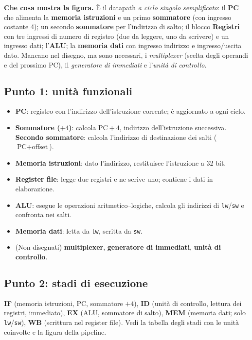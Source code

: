 \textbf{Che cosa mostra la figura.} È il datapath \emph{a ciclo singolo semplificato}: il \textbf{PC} che alimenta la \textbf{memoria istruzioni} e un primo \textbf{sommatore} (con ingresso costante 4); un secondo \textbf{sommatore} per l'indirizzo di salto; il blocco \textbf{Registri} con tre ingressi di numero di registro (due da leggere, uno da scrivere) e un ingresso dati; l'\textbf{ALU}; la \textbf{memoria dati} con ingresso indirizzo e ingresso/uscita dato. Mancano nel disegno, ma sono necessari, i \emph{multiplexer} (scelta degli operandi e del prossimo PC), il \emph{generatore di immediati} e l'\emph{unità di controllo}.

\subsection*{Punto 1: unità funzionali}
\begin{itemize}
    \item \textbf{PC}: registro con l'indirizzo dell'istruzione corrente; è aggiornato a ogni ciclo.
    \item \textbf{Sommatore ($+4$)}: calcola $\text{PC}+4$, indirizzo dell'istruzione successiva. \textbf{Secondo sommatore}: calcola l'indirizzo di destinazione dei salti ($\text{PC}+\text{offset}$).
    \item \textbf{Memoria istruzioni}: dato l'indirizzo, restituisce l'istruzione a 32 bit.
    \item \textbf{Register file}: legge due registri e ne scrive uno; contiene i dati in elaborazione.
    \item \textbf{ALU}: esegue le operazioni aritmetico--logiche, calcola gli indirizzi di \texttt{lw}/\texttt{sw} e confronta nei salti.
    \item \textbf{Memoria dati}: letta da \texttt{lw}, scritta da \texttt{sw}.
    \item (Non disegnati) \textbf{multiplexer}, \textbf{generatore di immediati}, \textbf{unità di controllo}.
\end{itemize}

\subsection*{Punto 2: stadi di esecuzione}
\textbf{IF} (memoria istruzioni, PC, sommatore $+4$), \textbf{ID} (unità di controllo, lettura dei registri, immediato), \textbf{EX} (ALU, sommatore di salto), \textbf{MEM} (memoria dati; solo \texttt{lw}/\texttt{sw}), \textbf{WB} (scrittura nel register file). Vedi la tabella degli stadi con le unità coinvolte e la figura della pipeline.

